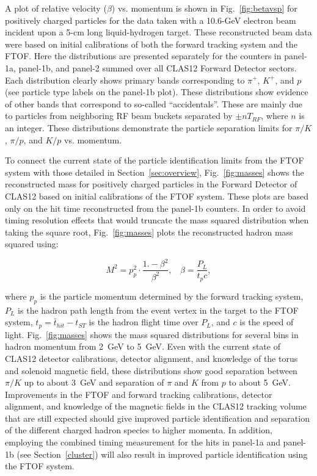 \documentclass[3p,times,twocolumn]{elsarticle}
\begin{document}
A plot of relative velocity ($\beta$) vs. momentum is shown in Fig.~\ref{fig:betavsp} for positively
charged particles for the data taken with a 10.6-GeV electron beam incident upon a 5-cm long liquid-hydrogen
target. These reconstructed beam data were based on initial calibrations of both the forward tracking
system and the FTOF. Here the distributions are presented separately for the counters in panel-1a,
panel-1b, and panel-2 summed over all CLAS12 Forward Detector sectors. Each distribution clearly shows
primary bands corresponding to $\pi^+$, $K^+$, and $p$ (see particle type labels on the panel-1b plot).
These distributions show evidence of other bands that correspond to so-called ``accidentals''. These are
mainly due to particles from neighboring RF beam buckets separated by $\pm n T_{RF}$, where $n$ is
an integer. These distributions demonstrate the particle separation limits for $\pi/K$, $\pi/p$, and $K/p$
vs. momentum.

To connect the current state of the particle identification limits from the FTOF system with those
detailed in Section~\ref{sec:overview}, Fig.~\ref{fig:masses} shows the reconstructed mass for positively
charged particles in the Forward Detector of CLAS12 based on initial calibrations of the FTOF system.
These plots are based only on the hit time reconstructed from the panel-1b counters. In order to avoid
timing resolution effects that would truncate the mass squared distribution when taking the square root,
Fig.~\ref{fig:masses} plots the reconstructed hadron mass squared using:

\begin{equation}
M^2 = p_p^2 \cdot \frac{1.-\beta^2}{\beta^2},~~~~\beta=\frac{P_L}{t_p c},
\end{equation}

\noindent
where $p_p$ is the particle momentum determined by the forward tracking system, $P_L$ is the hadron
path length from the event vertex in the target to the FTOF system, $t_p= \bar{t}_{hit} - t_{ST}$ is
the hadron flight time over $P_L$, and $c$ is the speed of light. Fig.~\ref{fig:masses} shows the mass
squared distributions for several bins in hadron momentum from 2~GeV to 5~GeV. Even with the current
state of CLAS12 detector calibrations, detector alignment, and knowledge of the torus and solenoid
magnetic field, these distributions show good separation between $\pi/K$ up to about 3~GeV and
separation of $\pi$ and $K$ from $p$ to about 5~GeV. Improvements in the FTOF and forward tracking
calibrations, detector alignment, and knowledge of the magnetic fields in the CLAS12 tracking volume
that are still expected should give improved particle identification and separation of the different charged
hadron species to higher momenta. In addition, employing the combined timing measurement for the hits in
panel-1a and panel-1b (see Section~\ref{cluster}) will also result in improved particle identification using the
FTOF system.
\end{document}
